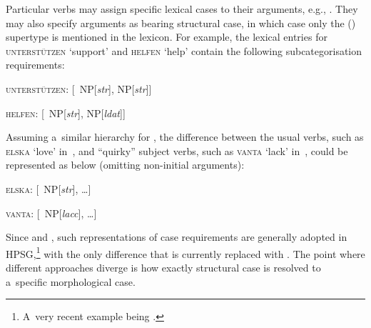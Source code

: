 \documentclass[output=paper]{langsci/langscibook}
\begin{document}
Particular verbs may assign specific lexical cases to their arguments, e.g., .  They may also specify arguments as bearing structural case, in which case only the () supertype is mentioned in the lexicon.  For example, the lexical entries for \textsc{unterst\"utzen} ‘support’ and \textsc{helfen} ‘help’ contain the following subcategorisation requirements:
\begin{examples}
\item \label{ex:hmsubcats}
  \begin{examples}
  \item \textsc{unterst\"utzen}: [~\la{}NP[\emph{str}],
    NP[\emph{str}]\ra{}] 
    \item \textsc{helfen}: [~\la{}NP[\emph{str}], NP[\emph{ldat}]\ra{}]
  \end{examples}
\end{examples}
Assuming a~similar  hierarchy for , the difference between the usual verbs, such as \textsc{elska} ‘love’ in~, and “quirky” subject verbs, such as \textsc{vanta} ‘lack’ in~, could be represented as below (omitting non-initial arguments):
\begin{examples}
\item \label{ex:islsubcats}
  \begin{examples}
  \item \textsc{elska}: [~\la{}NP[\emph{str}], …\ra{}] 
    \item \textsc{vanta}: [~\la{}NP[\emph{lacc}], …\ra{}]
  \end{examples}
\end{examples}
Since \citealt{Pollard94a} and \citealt{HM94a}, such representations of case requirements are generally adopted in HPSG,\footnote{A~very recent example being \citealt{mac:hue:18}.} with the only difference that  is currently replaced with .  The point where different approaches diverge is how exactly structural case is resolved to a~specific morphological case.
\end{document}
